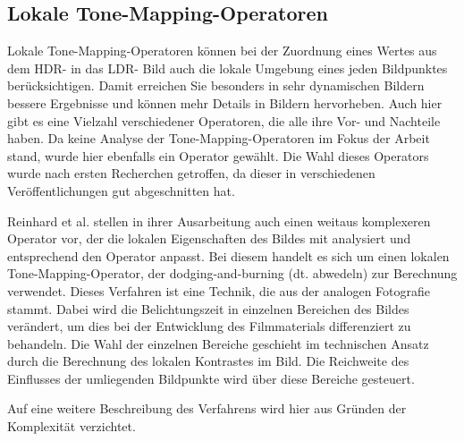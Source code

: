 \subsection{Lokale \gls{Tone-Mapping}-Operatoren}
\label{sub:tone:local}

Lokale \gls{Tone-Mapping}-Operatoren können bei der Zuordnung eines Wertes aus dem \gls{HDR}- in das \gls{LDR}- Bild auch die lokale Umgebung eines jeden Bildpunktes berücksichtigen. Damit erreichen Sie besonders in sehr dynamischen Bildern bessere Ergebnisse und können mehr Details in Bildern hervorheben. Auch hier gibt es eine Vielzahl verschiedener Operatoren, die alle ihre Vor- und Nachteile haben. Da keine Analyse der \gls{Tone-Mapping}-Operatoren im Fokus der Arbeit stand, wurde hier ebenfalls ein Operator gewählt. Die Wahl dieses Operators wurde nach ersten Recherchen getroffen, da dieser in verschiedenen Veröffentlichungen \cite{tone_mapper_1,tone_mapper_2} gut abgeschnitten hat.
 
Reinhard et al. \cite{ReinhardToneMapper} stellen in ihrer Ausarbeitung auch einen weitaus komplexeren Operator vor, der die lokalen Eigenschaften des Bildes mit analysiert und entsprechend den Operator anpasst. Bei diesem handelt es sich um einen lokalen \gls{Tone-Mapping}-Operator, der dodging-and-burning (dt. abwedeln) zur Berechnung verwendet. Dieses Verfahren ist eine Technik, die aus der analogen Fotografie stammt. Dabei wird die Belichtungszeit in einzelnen Bereichen des Bildes verändert, um dies bei der Entwicklung des Filmmaterials differenziert zu behandeln. Die Wahl der einzelnen Bereiche geschieht im technischen Ansatz durch die Berechnung des lokalen Kontrastes im Bild. Die Reichweite des Einflusses der umliegenden Bildpunkte wird über diese Bereiche gesteuert.

Auf eine weitere Beschreibung des Verfahrens wird hier aus Gründen der Komplexität verzichtet.


